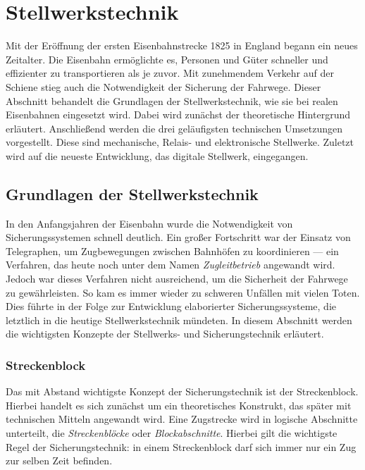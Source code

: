 \section{Stellwerkstechnik}\label{text:Grundlagen:Stellwerkstechnik}

Mit der Eröffnung der ersten Eisenbahnstrecke 1825 in England begann ein neues Zeitalter. Die Eisenbahn ermöglichte es, Personen und Güter schneller und effizienter zu transportieren als je zuvor. Mit zunehmendem Verkehr auf der Schiene stieg auch die Notwendigkeit der Sicherung der Fahrwege. Dieser Abschnitt behandelt die Grundlagen der Stellwerkstechnik, wie sie bei realen Eisenbahnen eingesetzt wird. Dabei wird zunächst der theoretische Hintergrund erläutert. Anschließend werden die drei geläufigsten technischen Umsetzungen vorgestellt. Diese sind mechanische, Relais- und elektronische Stellwerke. Zuletzt wird auf die neueste Entwicklung, das digitale Stellwerk, eingegangen.

\subsection{Grundlagen der Stellwerkstechnik}\label{text:Grundlagen:Stellwerkstechnik:Grundlagen-der-Stellwerkstechnik}

In den Anfangsjahren der Eisenbahn wurde die Notwendigkeit von Sicherungssystemen schnell deutlich. Ein großer Fortschritt war der Einsatz von Telegraphen, um Zugbewegungen zwischen Bahnhöfen zu koordinieren --- ein Verfahren, das heute noch unter dem Namen \textit{Zugleitbetrieb} angewandt wird. Jedoch war dieses Verfahren nicht ausreichend, um die Sicherheit der Fahrwege zu gewährleisten. So kam es immer wieder zu schweren Unfällen mit vielen Toten. Dies führte in der Folge zur Entwicklung elaborierter Sicherungssysteme, die letztlich in die heutige Stellwerkstechnik mündeten. In diesem Abschnitt werden die wichtigsten Konzepte der Stellwerks- und Sicherungstechnik erläutert.

\subsubsection*{Streckenblock}\label{text:Grundlagen:Stellwerkstechnik:Sicherung-des-Schienenverkehrs:Streckenblock}

Das mit Abstand wichtigste Konzept der Sicherungstechnik ist der Streckenblock. Hierbei handelt es sich zunächst um ein theoretisches Konstrukt, das später mit technischen Mitteln angewandt wird. Eine Zugstrecke wird in logische Abschnitte unterteilt, die \textit{Streckenblöcke} oder \textit{Blockabschnitte}. Hierbei gilt die wichtigste Regel der Sicherungstechnik: in einem Streckenblock darf sich immer nur ein Zug zur selben Zeit befinden.~\cite[][S.112 ff.]{bib:Sicherung-des-Schienenverkehrs}

